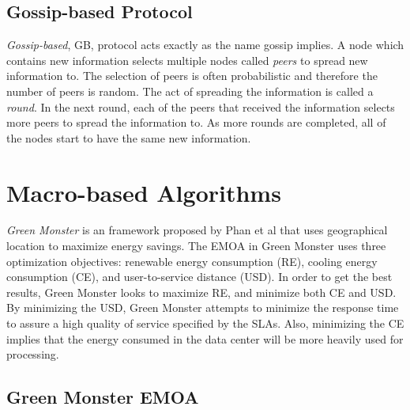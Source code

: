 \documentclass{sig-alternate}
\begin{document}
\subsection{Gossip-based Protocol}
\label{sec:GBP}

\emph{Gossip-based}, GB, protocol acts exactly as the name gossip implies. A node which contains new information selects multiple nodes called \emph{peers} to spread new information to. The selection of peers is often probabilistic and therefore the number of peers is random. The act of spreading the information is called a \emph{round}. In the next round, each of the peers that received the information selects more peers to spread the information to. As more rounds are completed, all of the nodes start to have the same new information.~\cite{Yanggratoke}


\section{Macro-based Algorithms}
\label{sec:MacAL}

\emph{Green Monster}
is an framework proposed by Phan et al that uses geographical location to maximize energy savings. The EMOA in Green Monster uses three optimization objectives: renewable energy consumption (RE), cooling energy consumption (CE), and user-to-service distance (USD). In order to get the best results, Green Monster looks to maximize RE, and minimize both CE and USD. By minimizing the USD, Green Monster attempts to minimize the response time to assure a high quality of service specified by the SLAs. Also, minimizing the CE implies that the energy consumed in the data center will be more heavily used for processing. 

\subsection{Green Monster EMOA}
\label{sec:GMEMOA}
\end{document}
